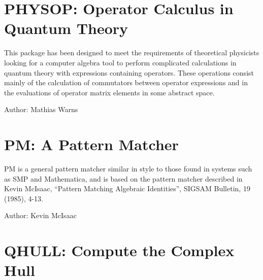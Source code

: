\section{PHYSOP: Operator Calculus in Quantum Theory}


This package has been designed to meet the requirements of theoretical
physicists looking for a computer algebra tool to perform complicated
calculations in quantum theory with expressions containing operators.
These operations consist mainly of the calculation of commutators between
operator expressions and in the evaluations of operator matrix elements in
some abstract space.

Author: Mathias Warns



\newpage

\section{PM: A \REDUCE Pattern Matcher}

PM is a general pattern matcher similar in style to those found in systems
such as SMP and Mathematica, and is based on the pattern matcher described
in Kevin McIsaac, ``Pattern Matching Algebraic Identities'', SIGSAM Bulletin,
19 (1985), 4-13.

Author: Kevin McIsaac



\newpage


\section{QHULL: Compute the Complex Hull}




